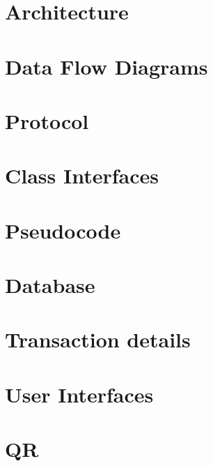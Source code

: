 \chapter{Architecture}


\chapter{Data Flow Diagrams}


\chapter{Protocol}


\chapter{Class Interfaces}


\chapter{Pseudocode}


\chapter{Database}


\chapter{Transaction details}


\chapter{User Interfaces}


\chapter{QR}

